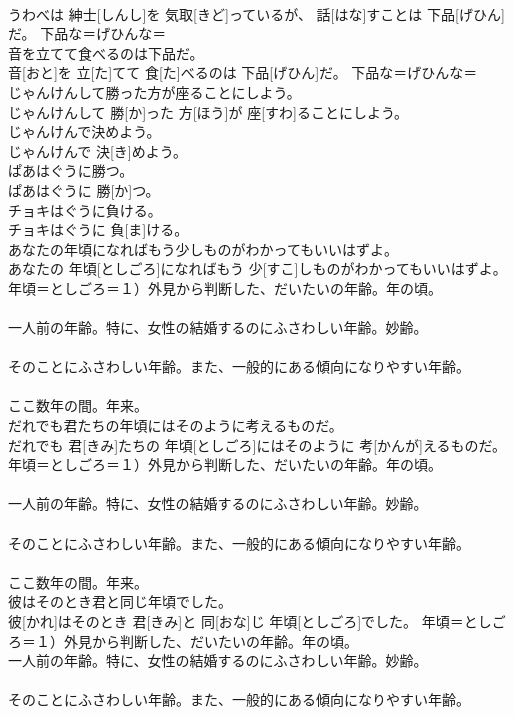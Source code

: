 \documentclass[8pt]{extreport}
\begin{document}
\begin{CJK}{UTF8}{min}
{\\	うわべは 紳士[しんし]を 気取[きど]っているが、 話[はな]すことは 下品[げひん]だ。	下品な＝げひんな＝ 
\\	音を立てて食べるのは下品だ。	
\\	音[おと]を 立[た]てて 食[た]べるのは 下品[げひん]だ。	下品な＝げひんな＝ 
\\	じゃんけんして勝った方が座ることにしよう。	
\\	じゃんけんして 勝[か]った 方[ほう]が 座[すわ]ることにしよう。	
\\	じゃんけんで決めよう。	
\\	じゃんけんで 決[き]めよう。	
\\	ぱあはぐうに勝つ。	
\\	ぱあはぐうに 勝[か]つ。	
\\	チョキはぐうに負ける。	
\\	チョキはぐうに 負[ま]ける。	
\\	あなたの年頃になればもう少しものがわかってもいいはずよ。	
\\	あなたの 年頃[としごろ]になればもう 少[すこ]しものがわかってもいいはずよ。	年頃＝としごろ＝１）外見から判断した、だいたいの年齢。年の頃。 　　　　　　　　
\\	一人前の年齢。特に、女性の結婚するのにふさわしい年齢。妙齢。 　　　　　　　　
\\	そのことにふさわしい年齢。また、一般的にある傾向になりやすい年齢。 　　　　　　　　
\\	ここ数年の間。年来。
\\	だれでも君たちの年頃にはそのように考えるものだ。	
\\	だれでも 君[きみ]たちの 年頃[としごろ]にはそのように 考[かんが]えるものだ。	年頃＝としごろ＝１）外見から判断した、だいたいの年齢。年の頃。 　　　　　　　　
\\	一人前の年齢。特に、女性の結婚するのにふさわしい年齢。妙齢。 　　　　　　　　
\\	そのことにふさわしい年齢。また、一般的にある傾向になりやすい年齢。 　　　　　　　　
\\	ここ数年の間。年来。
\\	彼はそのとき君と同じ年頃でした。	
\\	彼[かれ]はそのとき 君[きみ]と 同[おな]じ 年頃[としごろ]でした。	年頃＝としごろ＝１）外見から判断した、だいたいの年齢。年の頃。 　　　　　　　　
\\	一人前の年齢。特に、女性の結婚するのにふさわしい年齢。妙齢。 　　　　　　　　
\\	そのことにふさわしい年齢。また、一般的にある傾向になりやすい年齢。 　　　　　　　　
}
\end{CJK}
\end{document}

